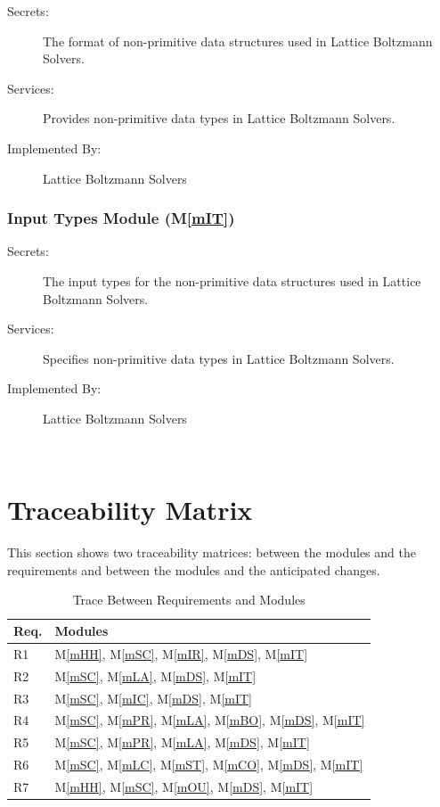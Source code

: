 \documentclass[12pt, titlepage]{article}
\newcommand{\mref}[1]{M\ref{#1}}
\newcommand{\famname}{Lattice Boltzmann Solvers} %
\begin{document}
\begin{description}
	\item[Secrets:] The format of non-primitive data structures used in \famname .
	\item[Services:] Provides non-primitive data types in \famname . 
	\item[Implemented By:] \famname
\end{description}

\subsubsection{Input Types Module (\mref{mIT})}

\begin{description}
	\item[Secrets:] The input types for the non-primitive data structures used in \famname .
	\item[Services:] Specifies non-primitive data types in \famname . 
	\item[Implemented By:] \famname
\end{description}

~\newpage

\section{Traceability Matrix} \label{SecTM}

This section shows two traceability matrices: between the modules and the
requirements and between the modules and the anticipated changes.

\begin{table}[H]
\centering
\begin{tabular}{p{} p{}}
\toprule
\textbf{Req.} & \textbf{Modules}\\
\midrule
R1 & \mref{mHH}, \mref{mSC}, \mref{mIR}, \mref{mDS}, \mref{mIT}\\
R2 & \mref{mSC}, \mref{mLA}, \mref{mDS}, \mref{mIT}\\
R3 & \mref{mSC}, \mref{mIC}, \mref{mDS}, \mref{mIT}\\
R4 & \mref{mSC}, \mref{mPR}, \mref{mLA}, \mref{mBO}, \mref{mDS}, \mref{mIT}\\
R5 & \mref{mSC}, \mref{mPR}, \mref{mLA}, \mref{mDS}, \mref{mIT}\\
R6 & \mref{mSC}, \mref{mLC}, \mref{mST}, \mref{mCO}, \mref{mDS}, \mref{mIT}\\
R7 & \mref{mHH}, \mref{mSC}, \mref{mOU}, \mref{mDS}, \mref{mIT}\\
\bottomrule
\end{tabular}
\caption{Trace Between Requirements and Modules}
\label{TblRT}
\end{table}
\end{document}
